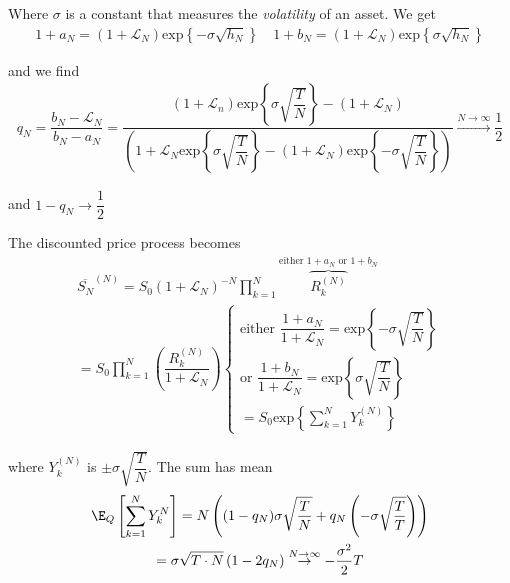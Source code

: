 \noindent Where $\sigma$ is a constant that measures the \textit{volatility} of an asset. We get
\begin{equation*}
  \begin{gathered}
    1+a_N = (1+\mathcal{L}_N)\text{exp}\left\{-\sigma\sqrt{h_N}\right\}\quad 1+b_N = (1+\mathcal{L}_N)\text{exp}\left\{\sigma\sqrt{h_N}\right\}
  \end{gathered}
\end{equation*}\par
\noindent and we find 
\begin{equation*}
  \begin{gathered}
    q_N  = \dfrac{b_N-\mathcal{L}_N}{b_N-a_N} = \dfrac{(1+\mathcal{L}_n)\text{exp}\left\{\sigma\sqrt{\dfrac{T}{N}}\right\}-(1+\mathcal{L}_N)}{(1+\mathcal{L}_N\text{exp}\left\{\sigma\sqrt{\dfrac{T}{N}}\right\}-(1+\mathcal{L}_N)\text{exp}\left\{-\sigma\sqrt{\dfrac{T}{N}}\right\})}\stackrel{N\to\infty}{\rightarrow} \dfrac{1}{2}
  \end{gathered}
\end{equation*}\par

\noindent and $1-q_N\to \dfrac{1}{2}$
\par\bigskip
\noindent The discounted price process becomes
\begin{equation*}
  \begin{gathered}
    \overline{S_N}^{(N)} = S_0(1+\mathcal{L}_N)^{-N}\prod_{k=1}^{N}\overbrace{R_k^{(N)}}^{\text{either $1+a_N$ or $1+b_N$}}\\
    = S_0\prod_{k=1}^{N}\left(\dfrac{R_k^{(N)}}{1+\mathcal{L}_N}\right)\begin{cases}
      \text{either } \dfrac{1+a_N}{1+\mathcal{L}_N} = \text{exp}\left\{-\sigma\sqrt{\dfrac{T}{N}}\right\}\\\text{or } \dfrac{1+b_N}{1+\mathcal{L}_N} = \text{exp}\left\{\sigma\sqrt{\dfrac{T}{N}}\right\}\\
      =S_0\text{exp}\left\{\sum_{k=1}^{N}Y_k^{(N)}\right\}
    \end{cases}
  \end{gathered}
\end{equation*}\par
\noindent where $Y_k^{(N)}$ is $\pm\sigma\sqrt{\dfrac{T}{N}}$. The sum has mean
\begin{equation*}
  \begin{gathered}
    \E_Q\left[\sum_{k=1}^{N}Y_k^N\right] = N\left((1-q_N)\sigma\sqrt{\dfrac{T}{N}}+q_N\left(-\sigma\sqrt{\dfrac{T}{T}}\right)\right)\\
    =\sigma\sqrt{T\cdot N}\left(1-2q_N\right)\stackrel{N\to\infty}{\rightarrow} -\dfrac{\sigma^2}{2}T
  \end{gathered}
\end{equation*}\par

